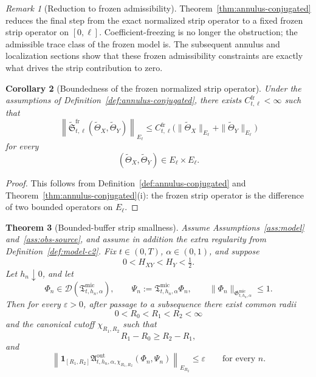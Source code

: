 \documentclass[11pt,a4paper]{amsart}
\theoremstyle{plain}
\newtheorem{theorem}{Theorem}[section]
\newtheorem{corollary}[theorem]{Corollary}
\theoremstyle{definition}
\theoremstyle{remark}
\newtheorem{remark}[theorem]{Remark}
\newcommand{\one}{\mathbf 1}
\begin{document}
\begin{remark}[Reduction to frozen admissibility]
\label{rem:annulus-conjugated}
Theorem~\ref{thm:annulus-conjugated} reduces the final step from the exact normalized strip operator to
a fixed frozen strip operator on \([0,\ell]\).  Coefficient-freezing is no longer the obstruction;
the admissible trace class of the frozen model is. The subsequent annulus
and localization sections show that these frozen admissibility constraints are exactly what drives
the strip contribution to zero.
\end{remark}

\begin{corollary}[Boundedness of the frozen normalized strip operator]
\label{cor:annulus-frozen-bounded}
Under the assumptions of Definition~\ref{def:annulus-conjugated}, there exists
\(C_{t,\ell}^{\mathrm{fr}}<\infty\) such that
\begin{equation}\label{eq:annulus-frozen-bounded}
\left\|
\widetilde{\mathfrak S}_{t,\ell}^{\mathrm{fr}}
(\widetilde\Theta_X,\widetilde\Theta_Y)
\right\|_{E_\ell}
\le
C_{t,\ell}^{\mathrm{fr}}
\bigl(
\|\widetilde\Theta_X\|_{E_\ell}
+
\|\widetilde\Theta_Y\|_{E_\ell}
\bigr)
\end{equation}
for every
\[
(\widetilde\Theta_X,\widetilde\Theta_Y)\in E_\ell\times E_\ell.
\]
\end{corollary}

\begin{proof}
This follows from Definition~\ref{def:annulus-conjugated} and
Theorem~\ref{thm:annulus-conjugated}(i): the frozen strip operator is the difference of two bounded
operators on \(E_\ell\).
\end{proof}

\begin{theorem}[Bounded-buffer strip smallness]
\label{thm:annulus-strip-small}
Assume Assumptions~\ref{ass:model} and~\ref{ass:obs-source}, and assume in addition the extra
regularity from Definition~\ref{def:model-c2}. Fix \(t\in(0,T)\), \(\alpha\in(0,1)\), and suppose
\[
0<H_{XY}<H_Y<\tfrac12.
\]
Let \(h_n\downarrow0\), and let
\[
\Phi_n\in\mathcal D(\mathfrak T_{t,h_n,\alpha}^{\mathrm{mic}}),
\qquad
\Psi_n:=\mathfrak T_{t,h_n,\alpha}^{\mathrm{mic}}\Phi_n,
\qquad
\|\Phi_n\|_{\mathfrak G_{t,h_n,\alpha}^{\mathrm{mic}}}\le1.
\]
Then for every \(\varepsilon>0\), after passage to a subsequence there exist common radii
\[
0<R_0<R_1<R_2<\infty
\]
and the canonical cutoff \(\chi_{R_1,R_2}\) such that
\[
R_1-R_0\ge R_2-R_1,
\]
and
\begin{equation}\label{eq:annulus-strip-small-thm}
\left\|
\one_{[R_1,R_2]}
\mathfrak A_{t,h_n,\alpha,\chi_{R_1,R_2}}^{\mathrm{out}}(\Phi_n,\Psi_n)
\right\|_{E_{R_2}}
\le
\varepsilon
\qquad\text{for every }n.
\end{equation}
\end{theorem}
\end{document}
